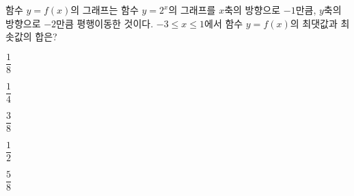 함수 $y=f(x)$의 그래프는 함수 $y=2^x$의 그래프를 $x$축의 방향으로 $-1$만큼, $y$축의 방향으로 $-2$만큼 평행이동한 것이다. $-3\le x\le 1$에서 함수 $y=f(x)$의 최댓값과 최솟값의 합은?
\begin{choices32}{\rule[-3ex]{0pt}{8ex}$\dfrac{1}{8}$}{\rule[-3ex]{0pt}{8ex}$\dfrac{1}{4}$}{\rule[-3ex]{0pt}{8ex}$\dfrac{3}{8}$}{\rule[-3ex]{0pt}{8ex}$\dfrac{1}{2}$}{\rule[-3ex]{0pt}{8ex}$\dfrac{5}{8}$}\end{choices32}
